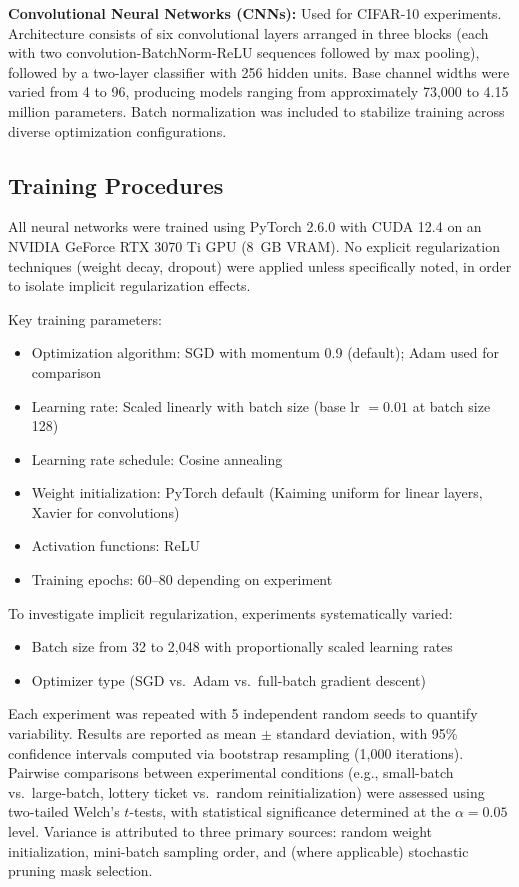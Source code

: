 \documentclass[conference]{IEEEtran}
\begin{document}
\textbf{Convolutional Neural Networks (CNNs):} Used for CIFAR-10 experiments. Architecture consists of six convolutional layers arranged in three blocks (each with two convolution-BatchNorm-ReLU sequences followed by max pooling), followed by a two-layer classifier with 256 hidden units. Base channel widths were varied from 4 to 96, producing models ranging from approximately 73,000 to 4.15 million parameters. Batch normalization was included to stabilize training across diverse optimization configurations.

\subsection{Training Procedures}

All neural networks were trained using PyTorch 2.6.0 with CUDA 12.4 on an NVIDIA GeForce RTX 3070 Ti GPU (8~GB VRAM). No explicit regularization techniques (weight decay, dropout) were applied unless specifically noted, in order to isolate implicit regularization effects.

Key training parameters:
\begin{itemize}
    \item Optimization algorithm: SGD with momentum 0.9 (default); Adam used for comparison
    \item Learning rate: Scaled linearly with batch size (base lr $= 0.01$ at batch size 128)
    \item Learning rate schedule: Cosine annealing
    \item Weight initialization: PyTorch default (Kaiming uniform for linear layers, Xavier for convolutions)
    \item Activation functions: ReLU
    \item Training epochs: 60--80 depending on experiment
\end{itemize}

To investigate implicit regularization, experiments systematically varied:
\begin{itemize}
    \item Batch size from 32 to 2,048 with proportionally scaled learning rates
    \item Optimizer type (SGD vs.\ Adam vs.\ full-batch gradient descent)
\end{itemize}

Each experiment was repeated with 5 independent random seeds to quantify variability. Results are reported as mean $\pm$ standard deviation, with 95\% confidence intervals computed via bootstrap resampling (1,000 iterations). Pairwise comparisons between experimental conditions (e.g., small-batch vs.\ large-batch, lottery ticket vs.\ random reinitialization) were assessed using two-tailed Welch's $t$-tests, with statistical significance determined at the $\alpha = 0.05$ level. Variance is attributed to three primary sources: random weight initialization, mini-batch sampling order, and (where applicable) stochastic pruning mask selection.
\end{document}
